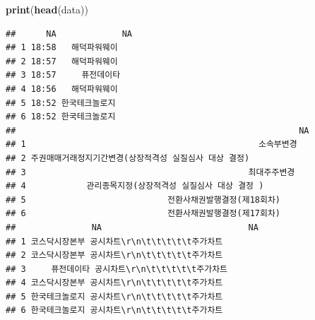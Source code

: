 \documentclass[12pt,]{book}
\newenvironment{Shaded}{\begin{snugshade}}{\end{snugshade}}
\newcommand{\DataTypeTok}[1]{\textcolor[rgb]{0.13,0.29,0.53}{#1}}
\newcommand{\DecValTok}[1]{\textcolor[rgb]{0.00,0.00,0.81}{#1}}
\newcommand{\KeywordTok}[1]{\textcolor[rgb]{0.13,0.29,0.53}{\textbf{#1}}}
\newcommand{\NormalTok}[1]{#1}
\newcommand{\OperatorTok}[1]{\textcolor[rgb]{0.81,0.36,0.00}{\textbf{#1}}}
\newcommand{\OtherTok}[1]{\textcolor[rgb]{0.56,0.35,0.01}{#1}}
\newcommand{\StringTok}[1]{\textcolor[rgb]{0.31,0.60,0.02}{#1}}
\begin{document}
\begin{Shaded}
\end{Shaded}

\begin{Shaded}
\begin{Highlighting}[]
\KeywordTok{print}\NormalTok{(}\KeywordTok{head}\NormalTok{(data))}
\end{Highlighting}
\end{Shaded}

\begin{verbatim}
##      NA             NA
## 1 18:58   해덕파워웨이
## 2 18:57   해덕파워웨이
## 3 18:57     퓨전데이타
## 4 18:56   해덕파워웨이
## 5 18:52 한국테크놀로지
## 6 18:52 한국테크놀로지
##                                                        NA
## 1                                              소속부변경
## 2 주권매매거래정지기간변경(상장적격성 실질심사 대상 결정)
## 3                                            최대주주변경
## 4            관리종목지정(상장적격성 실질심사 대상 결정 )
## 5                            전환사채권발행결정(제18회차)
## 6                            전환사채권발행결정(제17회차)
##               NA                             NA
## 1 코스닥시장본부 공시차트\r\n\t\t\t\t\t주가차트
## 2 코스닥시장본부 공시차트\r\n\t\t\t\t\t주가차트
## 3     퓨전데이타 공시차트\r\n\t\t\t\t\t주가차트
## 4 코스닥시장본부 공시차트\r\n\t\t\t\t\t주가차트
## 5 한국테크놀로지 공시차트\r\n\t\t\t\t\t주가차트
## 6 한국테크놀로지 공시차트\r\n\t\t\t\t\t주가차트
\end{verbatim}
\end{document}
